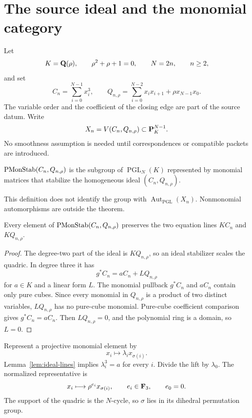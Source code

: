 \section{The source ideal and the monomial category}
\label{sec:source-category}

Let
\[
K=\mathbf Q(\rho),\qquad \rho^2+\rho+1=0,\qquad
N=2n,\qquad n\ge2,
\]
and set
\begin{equation}
C_n=\sum_{i=0}^{N-1}x_i^3,\qquad
Q_{n,\rho}=\sum_{i=0}^{N-2}x_ix_{i+1}
             +\rho x_{N-1}x_0.
\label{eq:source-pair}
\end{equation}
The variable order and the coefficient of the closing edge are part of the
source datum.  Write
\[
X_n=V(C_n,Q_{n,\rho})\subset\mathbf P_K^{N-1}.
\]
No smoothness assumption is needed until correspondences or compatible
packets are introduced.

\begin{definition}
\label{def:pmon}
\(\operatorname{PMonStab}(C_n,Q_{n,\rho})\) is the subgroup of
\(\operatorname{PGL}_N(K)\) represented by monomial matrices that stabilize
the homogeneous ideal \((C_n,Q_{n,\rho})\).
\end{definition}

This definition does not identify the group with
\(\operatorname{Aut}_{\operatorname{PGL}}(X_n)\).  Nonmonomial
automorphisms are outside the theorem.

\begin{lemma}
\label{lem:ideal-lines}
Every element of \(\operatorname{PMonStab}(C_n,Q_{n,\rho})\) preserves the two equation
lines \(KC_n\) and \(KQ_{n,\rho}\).
\end{lemma}

\begin{proof}
The degree-two part of the ideal is \(KQ_{n,\rho}\), so an ideal
stabilizer scales the quadric.  In degree three it has
\[
g^*C_n=aC_n+LQ_{n,\rho}
\]
for \(a\in K\) and a linear form \(L\).  The monomial pullback \(g^*C_n\)
and \(aC_n\) contain only pure cubes.  Since every monomial in
\(Q_{n,\rho}\) is a product of two distinct variables, \(LQ_{n,\rho}\)
has no pure-cube monomial.  Pure-cube coefficient comparison gives
\(g^*C_n=aC_n\).  Then \(LQ_{n,\rho}=0\), and the polynomial ring is a
domain, so \(L=0\).
\end{proof}

Represent a projective monomial element by
\[
x_i\longmapsto\lambda_i x_{\sigma(i)}.
\]
Lemma~\ref{lem:ideal-lines} implies \(\lambda_i^3=a\) for every \(i\).
Divide the lift by \(\lambda_0\).  The normalized representative is
\begin{equation}
x_i\longmapsto\rho^{e_i}x_{\sigma(i)},\qquad
e_i\in\mathbf F_3,\qquad e_0=0.
\label{eq:normalized-map}
\end{equation}
The support of the quadric is the \(N\)-cycle, so \(\sigma\) lies in its
dihedral permutation group.

